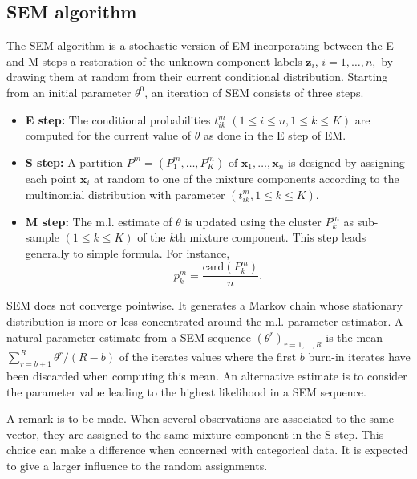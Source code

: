 \documentclass[12pt]{article}
\newcommand{\bz}{\mathbf{z}}
\begin{document}
\subsection{SEM algorithm}
The SEM algorithm is a stochastic version of EM incorporating between the E and M steps a
restoration of the unknown component labels $\bz_i$, $i=1,\ldots,n,$ by drawing them at random
from their current conditional distribution. Starting from an initial parameter $\theta^0$, an
iteration of SEM consists of three steps.
\begin{itemize}
\item {\bf E step:} The conditional probabilities $t^m_{ik}$ $(1 \leq i \leq n, 1 \leq k \leq
  K)$ are computed for the current value of $\theta$ as done in the E step of EM.
\item {\bf S step:} A partition $P^m=(P^m_1,\ldots,P^m_K)$ of ${\mathbf x}_1,\ldots,{\mathbf
    x}_n$ is designed by assigning each point ${\mathbf x}_i$ at random to one of the mixture
  components according to the multinomial distribution with parameter $(t^m_{ik}, 1 \leq k \leq
  K)$.
\item {\bf M step:} The m.l. estimate of $\theta$ is updated using the cluster $P^m_k$ as
  sub-sample $(1 \leq k \leq K)$ of the $k$th mixture component. This step leads generally to
  simple formula.  For instance,
  \begin{equation}
    p_k^m=\frac{\mbox{card}(P^m_k)}{n}.
  \end{equation}
\end{itemize}

SEM does not converge pointwise.  It generates a Markov chain whose stationary distribution is
more or less concentrated around the m.l. parameter estimator. A natural parameter estimate from
a SEM sequence $(\theta^r)_{r=1, \ldots,R}$ is the mean $\sum_{r=b+1}^R \theta^r/(R-b)$ of the
iterates values where the first $b$ burn-in iterates have been discarded when computing this
mean.  An alternative estimate is to consider the parameter value leading to the highest
likelihood in a SEM sequence.

A remark is to be made. When several observations are associated to the same vector, they are
assigned to the same mixture component in the S step. This choice can make a difference when
concerned with categorical data. It is expected to give a larger influence to the random
assignments.

\end{document}
